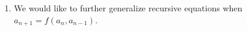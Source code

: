 \documentclass[a4paper,english,12pt]{article}
\begin{document}
\begin{exmp}
\begin{enumerate}
	\item We would like to further generalize recursive equations when $a_{n+1} = f(a_n, a_{n-1})$.
%
\end{enumerate} 
\end{exmp}
\end{document}
